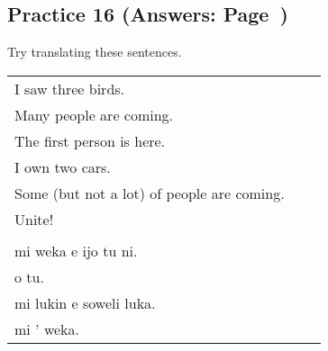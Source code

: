 \subsection*{Practice 16 (Answers: Page~\pageref{'numbers'})}
%
Try translating these sentences.

\begin{supertabular}{p{5,5cm}|ll}
I saw three birds.    \\ %
Many people are coming. \\   %
The first person is here. \\   %
I own two cars.   \\ %
Some (but not a lot) of people are coming. \\  %
Unite!    \\ %
 && \\ %
mi weka e ijo tu ni.   \\ %
o tu.   \\ %
mi lukin e soweli luka. \\   %
mi ' weka.   \\ %
\end{supertabular}
